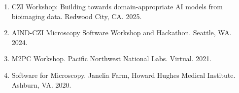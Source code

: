 \begin{enumerate}  
\item CZI Workshop: Building towards domain-appropriate AI models from bioimaging data. Redwood City, CA. 2025.
\item AIND-CZI Microscopy Software Workshop and Hackathon. Seattle, WA. 2024.
\item M2PC Workshop.  Pacific Northwest National Labs. Virtual. 2021.
\item Software for Microscopy.  Janelia Farm, Howard Hughes Medical Institute.  Ashburn, VA. 2020. 
\end{enumerate}